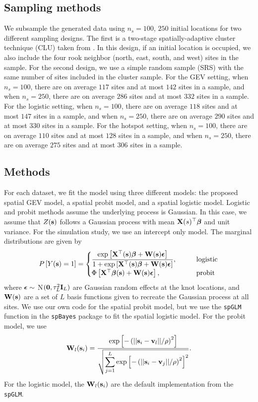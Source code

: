 \subsection{Sampling methods} \label{rbs:simsampling}
We subsample the generated data using $n_s = 100$, $250$ initial locations for two different sampling designs.
The first is a two-stage spatially-adaptive cluster technique (CLU) taken from \citet{Pacifici2016}.
In this design, if an initial location is occupied, we also include the four rook neighbor (north, east, south, and west) sites in the sample.
For the second design, we use a simple random sample (SRS) with the same number of sites included in the cluster sample.
For the GEV setting, when $n_s = 100$, there are on average $117$ sites and at most $142$ sites in a sample, and when $n_s = 250$, there are on average $286$ sites and at most $332$ sites in a sample.
For the logistic setting, when $n_s = 100$, there are on average $118$ sites and at most $147$ sites in a sample, and when $n_s = 250$, there are on average $290$ sites and at most $330$ sites in a sample.
For the hotspot setting, when $n_s = 100$, there are on average $110$ sites and at most $128$ sites in a sample, and when $n_s = 250$, there are on average $275$ sites and at most $306$ sites in a sample.

\subsection{Methods} \label{rbs:methods}
For each dataset, we fit the model using three different models: the proposed spatial GEV model, a spatial probit model, and a spatial logistic model.
Logistic and probit methods assume the underlying process is Gaussian.
In this case, we assume that $Z(\mathbf{s})$ follows a Gaussian process with mean $\mathbf{X}(s)^\top \mbox{\boldmath $\beta$}$ and unit variance.
For the simulation study, we use an intercept only model.
The marginal distributions are given by
\begin{align}
  P\left[Y(\mathbf{s}) = 1\right] = \begin{cases}
    \displaystyle \frac{\exp\left[\mathbf{X}^\top(\mathbf{s}) \mbox{\boldmath $\beta$} + \mathbf{W} (\mathbf{s}) \mbox{\boldmath $\epsilon$} \right]}{1 + \exp\left[\mathbf{X}^\top(\mathbf{s}) \mbox{\boldmath $\beta$} + \mathbf{W} (\mathbf{s}) \mbox{\boldmath $\epsilon$} \right]}, \qquad &\text{logistic}\\
    \Phi\left[\mathbf{X}^\top \mbox{\boldmath $\beta$} (\mathbf{s}) + \mathbf{W} (\mathbf{s}) \mbox{\boldmath $\epsilon$} \right], \qquad &\text{probit}
  \end{cases}
\end{align}
where $\mbox{\boldmath $\epsilon$} \sim$ N$(\mathbf{0}, \tau^2_L \mathbf{I}_L)$ are Gaussian random effects at the knot locations, and $\mathbf{W}(\mathbf{s})$ are a set of $L$ basis functions given to recreate the Gaussian process at all sites.
We use our own code for the spatial probit model, but we use the \texttt{spGLM} function in the \texttt{spBayes} package \citep{Finley2015} to fit the spatial logistic model.
For the probit model, we use
\begin{align}
  \mathbf{W}_l(\mathbf{s}_i) = \frac{\exp\left[-\left(||\mathbf{s}_i-\mathbf{v}_l||/\rho\right)^2\right]}
                 {\sqrt{\displaystyle \sum_{j=1}^L\exp\left[-\left(||\mathbf{s}_i-\mathbf{v}_j||/\rho\right)^2\right]^2}}.
\end{align}
For the logistic model, the $\mathbf{W}_l(\mathbf{s}_i)$ are the default implementation from the \texttt{spGLM}.

